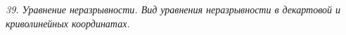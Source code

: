 \emph{39. Уравнение неразрывности. Вид уравнения неразрывности в декартовой и
криволинейных координатах.}

\newpage
